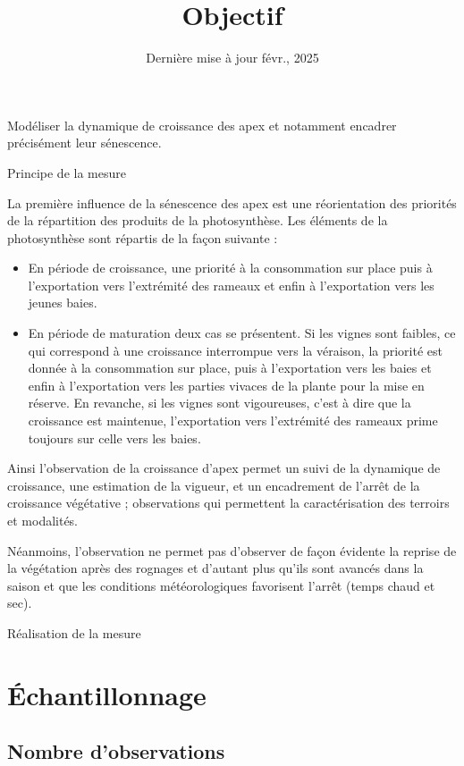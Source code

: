 \documentclass[
  a4paperpaper,
  DIV=11,
  numbers=noendperiod]{scrartcl}
\title{Objectif}
\author{}
\date{Dernière mise à jour févr., 2025}
\providecommand{\tightlist}{%
  \setlength{\itemsep}{0pt}\setlength{\parskip}{0pt}}\usepackage{longtable,booktabs,array}
\begin{document}
\maketitle


Modéliser la dynamique de croissance des apex et notamment encadrer
précisément leur sénescence.

Principe de la mesure

La première influence de la sénescence des apex est une réorientation
des priorités de la répartition des produits de la photosynthèse. Les
éléments de la photosynthèse sont répartis de la façon suivante :

\begin{itemize}
\tightlist
\item
  En période de croissance, une priorité à la consommation sur place
  puis à l'exportation vers l'extrémité des rameaux et enfin à
  l'exportation vers les jeunes baies.
\item
  En période de maturation deux cas se présentent. Si les vignes sont
  faibles, ce qui correspond à une croissance interrompue vers la
  véraison, la priorité est donnée à la consommation sur place, puis à
  l'exportation vers les baies et enfin à l'exportation vers les parties
  vivaces de la plante pour la mise en réserve. En revanche, si les
  vignes sont vigoureuses, c'est à dire que la croissance est maintenue,
  l'exportation vers l'extrémité des rameaux prime toujours sur celle
  vers les baies.
\end{itemize}

Ainsi l'observation de la croissance d'apex permet un suivi de la
dynamique de croissance, une estimation de la vigueur, et un encadrement
de l'arrêt de la croissance végétative ; observations qui permettent la
caractérisation des terroirs et modalités.

Néanmoins, l'observation ne permet pas d'observer de façon évidente la
reprise de la végétation après des rognages et d'autant plus qu'ils sont
avancés dans la saison et que les conditions météorologiques favorisent
l'arrêt (temps chaud et sec).

Réalisation de la mesure

\section{Échantillonnage}\label{uxe9chantillonnage}

\subsection{Nombre d'observations}\label{nombre-dobservations}
\end{document}
